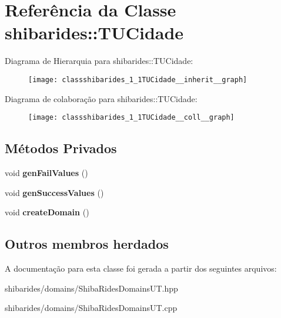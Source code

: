 \hypertarget{classshibarides_1_1TUCidade}{}\section{Referência da Classe shibarides\+:\+:T\+U\+Cidade}
\label{classshibarides_1_1TUCidade}


Diagrama de Hierarquia para shibarides\+:\+:T\+U\+Cidade\+:\nopagebreak
\begin{figure}[H]
\begin{center}
\leavevmode
\texttt{[image: classshibarides\_1\_1TUCidade\_\_inherit\_\_graph]}
\end{center}
\end{figure}


Diagrama de colaboração para shibarides\+:\+:T\+U\+Cidade\+:\nopagebreak
\begin{figure}[H]
\begin{center}
\leavevmode
\texttt{[image: classshibarides\_1\_1TUCidade\_\_coll\_\_graph]}
\end{center}
\end{figure}
\subsection*{Métodos Privados}
\begin{DoxyCompactItemize}
\item 
void {\bfseries gen\+Fail\+Values} ()\hypertarget{classshibarides_1_1TUCidade_ac9acc05f2f24dc5373db0e2865bc5ebe}{}\label{classshibarides_1_1TUCidade_ac9acc05f2f24dc5373db0e2865bc5ebe}

\item 
void {\bfseries gen\+Success\+Values} ()\hypertarget{classshibarides_1_1TUCidade_a794abad6cf007867b470091413cda5bd}{}\label{classshibarides_1_1TUCidade_a794abad6cf007867b470091413cda5bd}

\item 
void {\bfseries create\+Domain} ()\hypertarget{classshibarides_1_1TUCidade_a2d6b6611a3cb5245f22efba45c0d8e5c}{}\label{classshibarides_1_1TUCidade_a2d6b6611a3cb5245f22efba45c0d8e5c}

\end{DoxyCompactItemize}
\subsection*{Outros membros herdados}


A documentação para esta classe foi gerada a partir dos seguintes arquivos\+:\begin{DoxyCompactItemize}
\item 
shibarides/domains/Shiba\+Rides\+Domains\+U\+T.\+hpp\item 
shibarides/domains/Shiba\+Rides\+Domains\+U\+T.\+cpp\end{DoxyCompactItemize}

